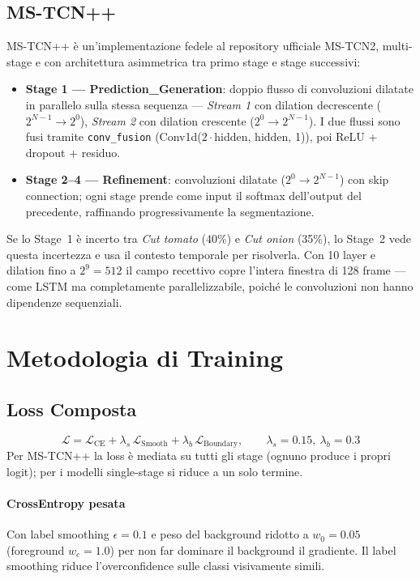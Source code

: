 \documentclass[12pt, a4paper]{article}
\begin{document}
\subsection{MS-TCN++}
MS-TCN++ \cite{li2020mstcn2} \`e un'implementazione fedele al repository
ufficiale MS-TCN2, multi-stage e con architettura asimmetrica tra primo stage
e stage successivi:
\begin{itemize}
  \item \textbf{Stage 1 --- Prediction\_Generation}: doppio flusso di
        convoluzioni dilatate in parallelo sulla stessa sequenza ---
        \textit{Stream 1} con dilation decrescente ($2^{N-1} \to 2^0$),
        \textit{Stream 2} con dilation crescente ($2^0 \to 2^{N-1}$).
        I due flussi sono fusi tramite \texttt{conv\_fusion}
        (Conv1d($2\cdot$hidden, hidden, 1)), poi ReLU + dropout + residuo.
  \item \textbf{Stage 2--4 --- Refinement}: convoluzioni dilatate
        ($2^0 \to 2^{N-1}$) con skip connection; ogni stage prende come input
        il softmax dell'output del precedente, raffinando progressivamente la
        segmentazione.
\end{itemize}
Se lo Stage~1 è incerto tra \textit{Cut tomato} (40\%) e \textit{Cut onion}
(35\%), lo Stage~2 vede questa incertezza e usa il contesto temporale per
risolverla. Con 10 layer e dilation fino a $2^9=512$ il campo recettivo
copre l'intera finestra di 128 frame --- come LSTM ma completamente
parallelizzabile, poiché le convoluzioni non hanno dipendenze sequenziali.


\section{Metodologia di Training}
\label{sec:metodologia}

\subsection{Loss Composta}

\begin{equation}
  \mathcal{L} = \mathcal{L}_{\text{CE}}
  + \lambda_s\,\mathcal{L}_{\text{Smooth}}
  + \lambda_b\,\mathcal{L}_{\text{Boundary}},
  \qquad \lambda_s = 0.15,\ \lambda_b = 0.3
\end{equation}
Per MS-TCN++ la loss \`e mediata su tutti gli stage (ognuno produce i propri
logit); per i modelli single-stage si riduce a un solo termine.

\paragraph{CrossEntropy pesata}
Con label smoothing $\epsilon = 0.1$ e peso del background ridotto a
$w_0 = 0.05$ (foreground $w_c = 1.0$) per non far dominare il background il
gradiente. Il label smoothing riduce l'overconfidence sulle classi visivamente
simili.
\end{document}
